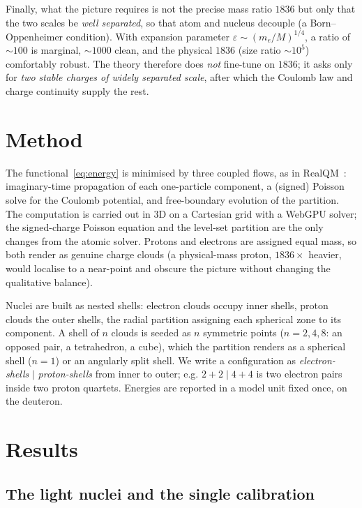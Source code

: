 \documentclass[11pt]{article}
\begin{document}
Finally, what the picture requires is not the precise mass ratio $1836$ but only that the two scales be
\emph{well separated}, so that atom and nucleus decouple (a Born--Oppenheimer condition). With
expansion parameter $\varepsilon\sim(m_e/M)^{1/4}$, a ratio of $\sim\!100$ is marginal, $\sim\!1000$
clean, and the physical $1836$ (size ratio $\sim\!10^{5}$) comfortably robust. The theory therefore
does \emph{not} fine-tune on $1836$; it asks only for \emph{two stable charges of widely separated
scale}, after which the Coulomb law and charge continuity supply the rest.

\section{Method}

The functional~\eqref{eq:energy} is minimised by three coupled flows, as in
RealQM~\cite{Johnson-RealQM}: imaginary-time propagation of each one-particle component,
a (signed) Poisson solve for the Coulomb potential, and free-boundary evolution of the
partition. The computation is carried out in 3D on a Cartesian grid with a WebGPU solver; the
signed-charge Poisson equation and the level-set partition are the only changes from the atomic
solver. Protons and electrons are assigned equal mass, so both render as genuine charge clouds
(a physical-mass proton, $1836\times$ heavier, would localise to a near-point and obscure the
picture without changing the qualitative balance).

Nuclei are built as nested shells: electron clouds occupy inner shells, proton clouds the outer
shells, the radial partition assigning each spherical zone to its component. A shell of $n$
clouds is seeded as $n$ symmetric points ($n=2,4,8$: an opposed pair, a tetrahedron, a cube),
which the partition renders as a spherical shell ($n=1$) or an angularly split shell. We write
a configuration as \emph{electron-shells} $\mid$ \emph{proton-shells} from inner to outer; e.g.
$2{+}2\mid 4{+}4$ is two electron pairs inside two proton quartets. Energies are reported in a
model unit fixed once, on the deuteron.

\section{Results}
\label{sec:results}

\subsection{The light nuclei and the single calibration}
\end{document}
